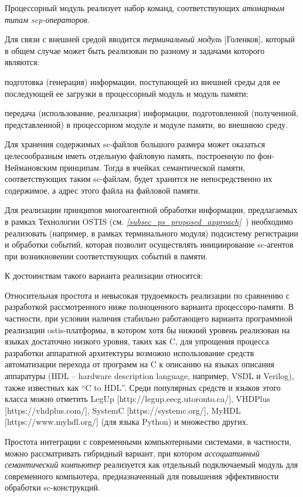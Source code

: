\begin{textitemize}
	\item Процессорный модуль реализует набор команд, соответствующих \textit{атомарным типам scp-операторов}.
	\item Для связи с внешней средой вводится \textit{терминальный модуль} [Голенков], который в общем случае может быть реализован по разному и задачами которого являются:
	\begin{textitemize}
		\item подготовка (генерация) информации, поступающей из внешней среды для ее последующей ее загрузки в процессорный модуль и модуль памяти;
		\item передача (использование, реализация) информации, подготовленной (полученной, представленной) в процессорном модуле и модуле памяти, во внешнюю среду.
	\end{textitemize}
	\item Для хранения содержимых sc-файлов большого размера может оказаться целесообразным иметь отдельную файловую память, построенную по фон-Неймановским принципам. Тогда в ячейках семантической памяти, соответствующих таким sc-файлам, будет хранится не непосредственно их содержимое, а адрес этого файла на файловой памяти.
	\item Для реализации принципов многоагентной обработки информации, предлагаемых в рамках Технологии OSTIS (см. \textit{\ref{subsec_ps_proposed_approach}~}) необходимо реализовать (например, в рамках терминального модуля) подсистему регистрации и обработки событий, которая позволит осуществлять инициирование sc-агентов при возникновении соответствующих событий в памяти.
\end{textitemize}

К достоинствам такого варианта реализации относятся:
\begin{textitemize}
	\item Относительная простота и невысокая трудоемкость реализации по сравнению с разработкой рассмотренного ниже полноценного варианта процессоро-памяти. В частности, при условии наличия стабильно работающего варианта программной реализации ostis-платформы, в котором хотя бы нижний уровень реализован на языках достаточно низкого уровня, таких как C, для упрощения процесса разработки аппаратной архитектуры возможно использование средств автоматизации перехода от программ на C к описанию на языках описания аппаратуры (HDL -- hardware description language, например, VSDL и Verilog), также известных как ``C to HDL''. Среди популярных средств и языков этого класса можно отметить LegUp [http://legup.eecg.utoronto.ca/], VHDPlus [https://vhdplus.com/], SystemC [https://systemc.org/], MyHDL [https://www.myhdl.org/] (для языка Python) и множество других.
	\item Простота интеграции с современными компьютерными системами, в частности, можно рассматривать гибридный вариант, при котором \textit{ассоциативный семантический компьютер} реализуется как отдельный подключаемый модуль для современного компьютера, предназначенный для повышения эффективности обработки sc-конструкций.
\end{textitemize}

